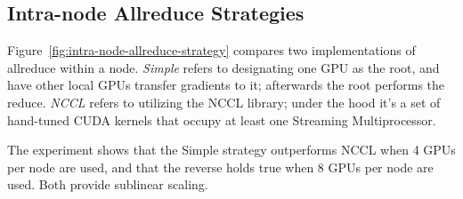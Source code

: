 \subsection{Intra-node Allreduce Strategies}
Figure~\ref{fig:intra-node-allreduce-strategy} compares two implementations of
allreduce within a node.  \emph{Simple} refers to designating one GPU as the
root, and have other local GPUs transfer gradients to it; afterwards the root
performs the reduce.  \emph{NCCL} refers to utilizing the NCCL library; under
the hood it's a set of hand-tuned CUDA kernels that occupy at least one
Streaming Multiprocessor.

The experiment shows that the Simple strategy outperforms NCCL when 4 GPUs per
node are used, and that the reverse holds true when 8 GPUs per node are
used. Both provide sublinear scaling.



